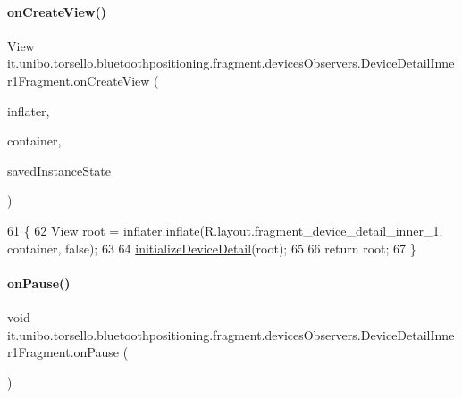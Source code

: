 \paragraph{\texorpdfstring{on\+Create\+View()}{onCreateView()}}
{\footnotesize\ttfamily View it.\+unibo.\+torsello.\+bluetoothpositioning.\+fragment.\+devices\+Observers.\+Device\+Detail\+Inner1\+Fragment.\+on\+Create\+View (\begin{DoxyParamCaption}\item[{Layout\+Inflater}]{inflater,  }\item[{View\+Group}]{container,  }\item[{Bundle}]{saved\+Instance\+State }\end{DoxyParamCaption})}


\begin{DoxyCode}
61                                                                                                       \{
62         View root = inflater.inflate(R.layout.fragment\_device\_detail\_inner\_1, container, \textcolor{keyword}{false});
63 
64         \hyperlink{classit_1_1unibo_1_1torsello_1_1bluetoothpositioning_1_1fragment_1_1devicesObservers_1_1DeviceDetailInner1Fragment_a60ac3d2537a790a04e49c72c3651ff25_a60ac3d2537a790a04e49c72c3651ff25}{initializeDeviceDetail}(root);
65 
66         \textcolor{keywordflow}{return} root;
67     \}
\end{DoxyCode}
\hypertarget{classit_1_1unibo_1_1torsello_1_1bluetoothpositioning_1_1fragment_1_1devicesObservers_1_1DeviceDetailInner1Fragment_a9629cf5558354f0b8041e5292b93c22a_a9629cf5558354f0b8041e5292b93c22a}{}\label{classit_1_1unibo_1_1torsello_1_1bluetoothpositioning_1_1fragment_1_1devicesObservers_1_1DeviceDetailInner1Fragment_a9629cf5558354f0b8041e5292b93c22a_a9629cf5558354f0b8041e5292b93c22a} 
\paragraph{\texorpdfstring{on\+Pause()}{onPause()}}
{\footnotesize\ttfamily void it.\+unibo.\+torsello.\+bluetoothpositioning.\+fragment.\+devices\+Observers.\+Device\+Detail\+Inner1\+Fragment.\+on\+Pause (\begin{DoxyParamCaption}{ }\end{DoxyParamCaption})}


